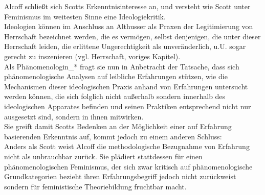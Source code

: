 Alcoff schließt sich Scotts Erkenntnisinteresse an, und versteht
wie Scott unter Feminismus im weitesten Sinne eine Ideologiekritik.\\
Ideologien
können im Anschluss an Althusser als Praxen der Legitimierung von Herrschaft
bezeichnet werden, die es vermögen, selbst denjenigen, die unter dieser
Herrschaft leiden, die erlittene Ungerechtigkeit als unveränderlich, u.U. sogar
gerecht zu inszenieren (vgl. Herrschaft, voriges Kapitel). \\
Als Phänomenologin\_* fragt sie
nun in Anbetracht der Tatsache, dass sich phänomenologische Analysen auf
leibliche Erfahrungen stützen, wie die Mechanismen dieser ideologischen Praxis
anhand von Erfahrungen untersucht werden können, die sich folglich nicht
außerhalb sondern innerhalb des ideologischen Apparates befinden und seinen
Praktiken entsprechend nicht nur ausgesetzt sind, sondern in ihnen mitwirken.\\

\noindent Sie greift damit Scotts Bedenken an der Möglichkeit einer auf Erfahrung
basierenden Erkenntnis auf, kommt jedoch zu einem anderen Schluss:\\
Anders als
Scott weist Alcoff die methodologische Bezugnahme von Erfahrung nicht als
unbrauchbar zurück. Sie plädiert stattdessen für einen phänomenologischen
Feminismus, der sich zwar kritisch auf phänomenologische Grundkategorien
bezieht ihren Erfahrungsbegriff jedoch nicht zurückweist sondern für
feministische Theoriebildung fruchtbar macht.\\

